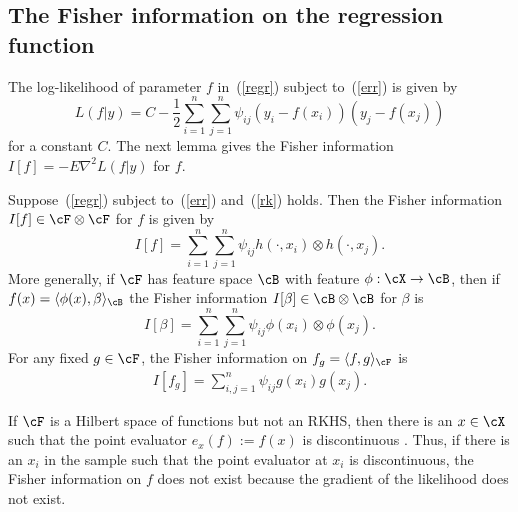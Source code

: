 \documentclass[preprint,12pt,authoryear]{elsarticle}
\begin{document}
\subsection{The Fisher information on the regression function}\label{sec-fish}

The log-likelihood of parameter $f$ in~(\ref{regr}) subject to~(\ref{err}) is given by
\[  L(f|y) = C - \frac12\sum_{i=1}^n\sum_{j=1}^n\psi_{ij}(y_i-f(x_i))(y_j-f(x_j)) \]
for a constant $C$. 
The next lemma gives the Fisher information $I[f] = -E\nabla^2 L(f|y)$ for $f$.
\begin{lemma}\label{lem-fish}
	Suppose~(\ref{regr}) subject to~(\ref{err}) and~(\ref{rk}) holds.
	Then the Fisher information $I[f]\in\cF\otimes\cF$ for $f$ is given by
	\[  I[f] = \sum_{i=1}^n\sum_{j=1}^n \psi_{ij}h(\cdot,x_i)\otimes h(\cdot,x_j). \]
	More generally, if $\cF$ has feature space $\cB$ with feature $\phi:\cX\rightarrow\cB$, then if $f(x)=\langle\phi(x),\beta\rangle_\cB$ the Fisher information $I[\beta]\in\cB\otimes\cB$ for $\beta$ is
	\[  I[\beta] = \sum_{i=1}^n\sum_{j=1}^n\psi_{ij}\phi(x_i)\otimes\phi(x_j). \]
	For any fixed $g\in\cF$, the Fisher information on $f_g=\langle f,g\rangle_\cF$ is
	\begin{align*}
	I[f_g]  = \sum_{i,j=1}^n \psi_{ij}g(x_i)g(x_j).
	\end{align*}
\end{lemma}

\begin{remark}
	If $\cF$ is a Hilbert space of functions but not an RKHS, then there is an $x\in\cX$ such that the point evaluator $e_x(f):=f(x)$ is discontinuous \citep{aronszajn50}. Thus, if there is an $x_i$ in the sample such that the point evaluator at $x_i$ is discontinuous, the Fisher information on $f$ does not exist because the gradient of the likelihood does not exist.
\end{remark}
\end{document}
